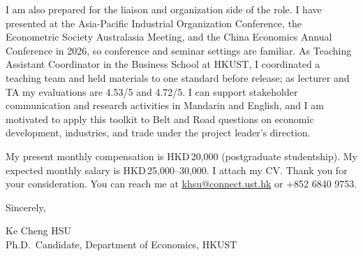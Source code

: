 \documentclass[11pt]{article}
\begin{document}
I am also prepared for the liaison and organization side of the role. I have presented at the Asia-Pacific Industrial Organization Conference, the Econometric Society Australasia Meeting, and the China Economics Annual Conference in 2026, so conference and seminar settings are familiar. As Teaching Assistant Coordinator in the Business School at HKUST, I coordinated a teaching team and held materials to one standard before release; as lecturer and TA my evaluations are 4.53/5 and 4.72/5. I can support stakeholder communication and research activities in Mandarin and English, and I am motivated to apply this toolkit to Belt and Road questions on economic development, industries, and trade under the project leader's direction.

My present monthly compensation is HKD\,20,000 (postgraduate studentship). My expected monthly salary is HKD\,25,000--30,000. I attach my CV. Thank you for your consideration. You can reach me at \href{mailto:khsu@connect.ust.hk}{khsu@connect.ust.hk} or +852 6840 9753.

\vspace{0.18em}
Sincerely,

\vspace{0.18em}
Ke Cheng HSU \\
Ph.D.\ Candidate, Department of Economics, HKUST
\end{document}
